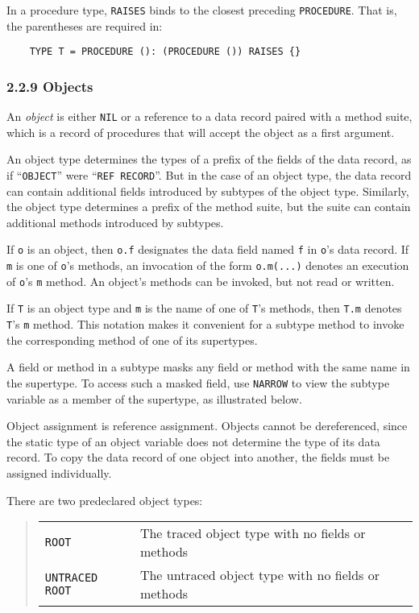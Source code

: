 \documentclass[10pt]{article}
\begin{document}
In a procedure type, \verb|RAISES| binds to the closest preceding
\verb|PROCEDURE|.  That is, the parentheses are required in:
\begin{verbatim}
    TYPE T = PROCEDURE (): (PROCEDURE ()) RAISES {}
\end{verbatim}

\subsubsection*{2.2.9 Objects}

An \emph{object} is either \verb|NIL| or a reference to a data record paired
with a method suite, which is a record of procedures that will accept the
object as a first argument.

An object type determines the types of a prefix of the fields of the data
record, as if ``\verb|OBJECT|'' were ``\verb|REF RECORD|''.  But in the case
of an object type, the data record can contain additional fields introduced by
subtypes of the object type.  Similarly, the object type determines a prefix
of the method suite, but the suite can contain additional methods introduced
by subtypes.

If \verb|o| is an object, then \verb|o.f| designates the data field named
\verb|f| in \verb|o|'s data record.  If \verb|m| is one of \verb|o|'s methods,
an invocation of the form \verb|o.m(...)| denotes an execution of \verb|o|'s
\verb|m| method.  An object's methods can be invoked, but not read or written.

If \verb|T| is an object type and \verb|m| is the name of one of \verb|T|'s
methods, then \verb|T.m| denotes \verb|T|'s \verb|m| method.  This notation
makes it convenient for a subtype method to invoke the corresponding method of
one of its supertypes.

A field or method in a subtype masks any field or method with the same name in
the supertype.  To access such a masked field, use \verb|NARROW| to view the
subtype variable as a member of the supertype, as illustrated below.

Object assignment is reference assignment.  Objects cannot be dereferenced,
since the static type of an object variable does not determine the type of its
data record.  To copy the data record of one object into another, the fields
must be assigned individually.

There are two predeclared object types:
\begin{quote}
  \begin{tabular}{ll}
    \verb|ROOT|          & The traced object type with no fields or methods \\
    \verb|UNTRACED ROOT| & The untraced object type with no fields or methods \\
  \end{tabular}
\end{quote}
\end{document}

